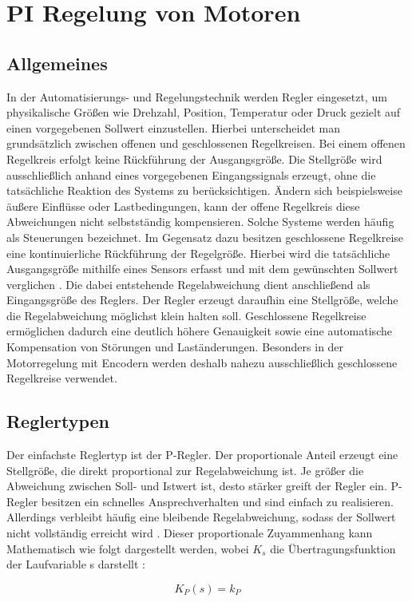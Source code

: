%
%
%


\chapter{PI Regelung von Motoren} 

\section{Allgemeines} 
In der Automatisierungs- und Regelungstechnik werden Regler eingesetzt, um physikalische Größen wie Drehzahl, Position, Temperatur oder Druck gezielt auf einen vorgegebenen Sollwert einzustellen. Hierbei unterscheidet man grundsätzlich zwischen offenen und geschlossenen Regelkreisen. Bei einem offenen Regelkreis erfolgt keine Rückführung der Ausgangsgröße. Die Stellgröße wird ausschließlich anhand eines vorgegebenen Eingangssignals erzeugt, ohne die tatsächliche Reaktion des Systems zu berücksichtigen. Ändern sich beispielsweise äußere Einflüsse oder Lastbedingungen, kann der offene Regelkreis diese Abweichungen nicht selbstständig kompensieren. Solche Systeme werden häufig als Steuerungen bezeichnet.
\cite{Lunze:2020}
Im Gegensatz dazu besitzen geschlossene Regelkreise eine kontinuierliche Rückführung der Regelgröße. Hierbei wird die tatsächliche Ausgangsgröße mithilfe eines Sensors erfasst und mit dem gewünschten Sollwert verglichen \cite{Loose:2026}. Die dabei entstehende Regelabweichung dient anschließend als Eingangsgröße des Reglers. Der Regler erzeugt daraufhin eine Stellgröße, welche die Regelabweichung möglichst klein halten soll. Geschlossene Regelkreise ermöglichen dadurch eine deutlich höhere Genauigkeit sowie eine automatische Kompensation von Störungen und Laständerungen. Besonders in der Motorregelung mit Encodern werden deshalb nahezu ausschließlich geschlossene Regelkreise verwendet. \cite{Lunze:2020}

\section{Reglertypen} 
Der einfachste Reglertyp ist der P-Regler. Der proportionale Anteil erzeugt eine Stellgröße, die direkt proportional zur Regelabweichung ist. Je größer die Abweichung zwischen Soll- und Istwert ist, desto stärker greift der Regler ein. P-Regler besitzen ein schnelles Ansprechverhalten und sind einfach zu realisieren. Allerdings verbleibt häufig eine bleibende Regelabweichung, sodass der Sollwert nicht vollständig erreicht wird \cite{Lunze:2020}. Dieser proportionale Zuyammenhang kann  Mathematisch wie folgt dargestellt werden, wobei $K_s$ die Übertragungsfunktion der Laufvariable s darstellt : 
\begin{center}
	\begin{equation}
		K_P(s) =k_P
	\end{equation}
\end{center}

